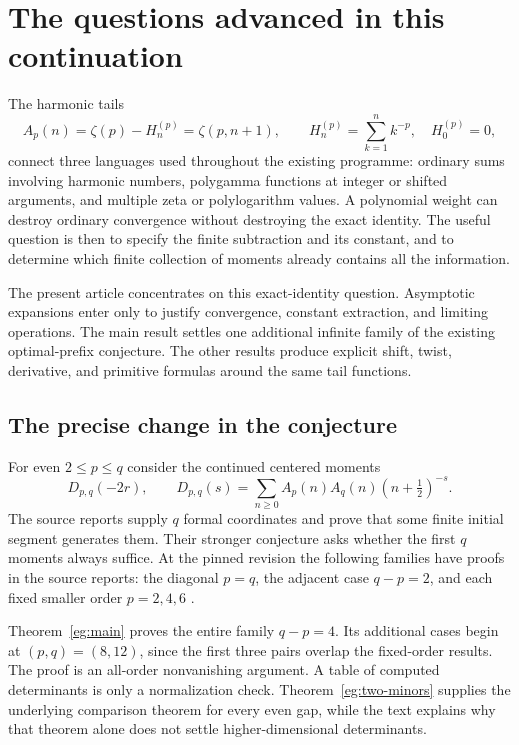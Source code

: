 \section{The questions advanced in this continuation}
\label{sec:scope}

The harmonic tails
\[
 A_p(n)=\zeta(p)-H_n^{(p)}=\zeta(p,n+1),\qquad
 H_n^{(p)}=\sum_{k=1}^n k^{-p},\quad H_0^{(p)}=0,
\]
connect three languages used throughout the existing programme:
ordinary sums involving harmonic numbers, polygamma functions at
integer or shifted arguments, and multiple zeta or polylogarithm
values. A polynomial weight can destroy ordinary convergence without
destroying the exact identity. The useful question is then to specify
the finite subtraction and its constant, and to determine which
finite collection of moments already contains all the information.

The present article concentrates on this exact-identity question.
Asymptotic expansions enter only to justify convergence, constant
extraction, and limiting operations. The main result settles one
additional infinite family of the existing optimal-prefix conjecture.
The other results produce explicit shift, twist, derivative, and
primitive formulas around the same tail functions.

\subsection{The precise change in the conjecture}

For even $2\le p\le q$ consider the continued centered moments
\[
 D_{p,q}(-2r),\qquad
 D_{p,q}(s)=\sum_{n\ge0}
       A_p(n)A_q(n)(n+\tfrac12)^{-s}.
\]
The source reports supply $q$ formal coordinates and prove that
some finite initial segment generates them. Their stronger conjecture
asks whether the first $q$ moments always suffice. At the pinned
revision the following families have proofs in the source reports:
the diagonal $p=q$, the adjacent case $q-p=2$, and each fixed smaller
order $p=2,4,6$ \cite{Canonical,Differential,Bernoulli,Polygamma}.

Theorem~\ref{eg:main} proves the entire family $q-p=4$.
Its additional cases begin at $(p,q)=(8,12)$, since the first three
pairs overlap the fixed-order results. The proof is an all-order
nonvanishing argument. A table of computed determinants is only a
normalization check. Theorem~\ref{eg:two-minors} supplies the underlying
comparison theorem for every even gap, while the text explains why
that theorem alone does not settle higher-dimensional determinants.

